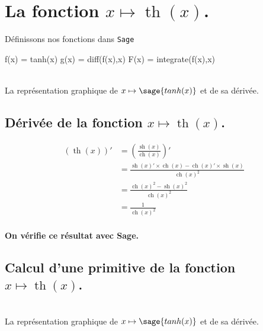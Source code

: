 \documentclass[a4paper,landscape,17pt]{extreport} %
\renewcommand{\sinh}{\mathop{\mathrm{sh}}}
\renewcommand{\cosh}{\mathop{\mathrm{ch}}}
\renewcommand{\tanh}{\mathop{\mathrm{th}}}
\begin{document}
\section{La fonction  $x \mapsto \tanh(x)$.}

Définissons nos fonctions dans {\texttt{Sage}}
\begin{sageblock}
    f(x) = tanh(x)
    g(x) = diff(f(x),x)
    F(x) = integrate(f(x),x)
\end{sageblock}


\begin{center}
 \\
La représentation graphique de $x \mapsto \sage{tanh(x)} $ et de sa dérivée.
\end{center}

\subsection{Dérivée de la fonction $x \mapsto \tanh(x)$.}

\begin{align*}
(\tanh(x))' & =  \left(\frac{\sinh(x)}{\cosh(x)}\right)' \\
&  =  \frac{\sinh(x)' \times \cosh(x) - \cosh(x)' \times \sinh(x)}{\cosh(x)^2} \\ 
&  =   \frac{\cosh(x)^2 -\sinh(x)^2}{\cosh(x)^2} \\
&  =  \frac{1}{\cosh(x)^2}
\end{align*}


\paragraph{On vérifie ce résultat avec Sage.}



\subsection{Calcul d'une primitive de la fonction  $x \mapsto \tanh(x)$.}

\begin{center}
 \\
La représentation graphique de $x \mapsto \sage{tanh(x)} $ et de sa dérivée.
\end{center}
\end{document}
